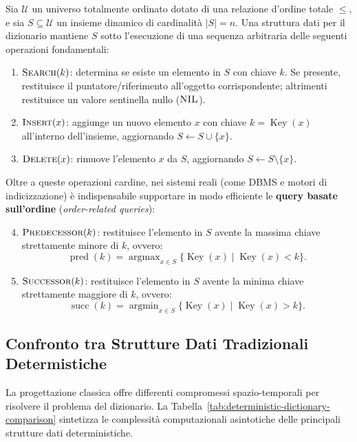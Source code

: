\begin{definition}
Sia $\mathcal{U}$ un universo totalmente ordinato dotato di una relazione d'ordine totale $\le$, e sia $S \subseteq \mathcal{U}$ un insieme dinamico di cardinalità $|S| = n$. Una struttura dati per il dizionario mantiene $S$ sotto l'esecuzione di una sequenza arbitraria delle seguenti operazioni fondamentali:
\begin{enumerate}
  \item $\textsc{Search}(k)$: determina se esiste un elemento in $S$ con chiave $k$. Se presente, restituisce il puntatore/riferimento all'oggetto corrispondente; altrimenti restituisce un valore sentinella nullo ($\textsc{NIL}$).
  \item $\textsc{Insert}(x)$: aggiunge un nuovo elemento $x$ con chiave $k = \operatorname{Key}(x)$ all'interno dell'insieme, aggiornando $S \leftarrow S \cup \{x\}$.
  \item $\textsc{Delete}(x)$: rimuove l'elemento $x$ da $S$, aggiornando $S \leftarrow S \setminus \{x\}$.
\end{enumerate}
Oltre a queste operazioni cardine, nei sistemi reali (come DBMS e motori di indicizzazione) è indispensabile supportare in modo efficiente le \textbf{query basate sull'ordine} (\textit{order-related queries}):
\begin{enumerate}
  \setcounter{enumi}{3}
  \item $\textsc{Predecessor}(k)$: restituisce l'elemento in $S$ avente la massima chiave strettamente minore di $k$, ovvero:
  \begin{equation}
    \operatorname{pred}(k) = \operatorname{argmax}_{x \in S} \{\operatorname{Key}(x) \mid \operatorname{Key}(x) < k\}.
  \end{equation}
  \item $\textsc{Successor}(k)$: restituisce l'elemento in $S$ avente la minima chiave strettamente maggiore di $k$, ovvero:
  \begin{equation}
    \operatorname{succ}(k) = \operatorname{argmin}_{x \in S} \{\operatorname{Key}(x) \mid \operatorname{Key}(x) > k\}.
  \end{equation}
\end{enumerate}
\end{definition}

\FloatBarrier
\subsection{Confronto tra Strutture Dati Tradizionali Determistiche}
La progettazione classica offre differenti compromessi spazio-temporali per risolvere il problema del dizionario. La Tabella~\ref{tab:deterministic-dictionary-comparison} sintetizza le complessità computazionali asintotiche delle principali strutture dati deterministiche.

